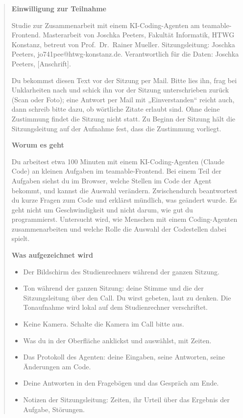 \begin{quote}
\setlength{\emergencystretch}{1em}%
\textbf{Einwilligung zur Teilnahme}

Studie zur Zusammenarbeit mit einem KI-Coding-Agenten am teamable-Frontend. Masterarbeit von Joschka Peeters, Fakultät Informatik, HTWG Konstanz, betreut von Prof.\ Dr.\ Rainer Mueller. Sitzungsleitung: Joschka Peeters, jo741pee@htwg-konstanz.de. Verantwortlich für die Daten: Joschka Peeters, [Anschrift].

Du bekommst diesen Text vor der Sitzung per Mail. Bitte lies ihn, frag bei Unklarheiten nach und schick ihn vor der Sitzung unterschrieben zurück (Scan oder Foto); eine Antwort per Mail mit „Einverstanden“ reicht auch, dann schreib bitte dazu, ob wörtliche Zitate erlaubt sind. Ohne deine Zustimmung findet die Sitzung nicht statt. Zu Beginn der Sitzung hält die Sitzungsleitung auf der Aufnahme fest, dass die Zustimmung vorliegt.

\textbf{Worum es geht}

Du arbeitest etwa 100 Minuten mit einem KI-Coding-Agenten (Claude Code) an kleinen Aufgaben im teamable-Frontend. Bei einem Teil der Aufgaben siehst du im Browser, welche Stellen im Code der Agent bekommt, und kannst die Auswahl verändern. Zwischendurch beantwortest du kurze Fragen zum Code und erklärst mündlich, was geändert wurde. Es geht nicht um Geschwindigkeit und nicht darum, wie gut du programmierst. Untersucht wird, wie Menschen mit einem Coding-Agenten zusammenarbeiten und welche Rolle die Auswahl der Codestellen dabei spielt.

\textbf{Was aufgezeichnet wird}

\begin{itemize}
\item Der Bildschirm des Studienrechners während der ganzen Sitzung.
\item Ton während der ganzen Sitzung: deine Stimme und die der Sitzungsleitung über den Call. Du wirst gebeten, laut zu denken. Die Tonaufnahme wird lokal auf dem Studienrechner verschriftet.
\item Keine Kamera. Schalte die Kamera im Call bitte aus.
\item Was du in der Oberfläche anklickst und auswählst, mit Zeiten.
\item Das Protokoll des Agenten: deine Eingaben, seine Antworten, seine Änderungen am Code.
\item Deine Antworten in den Fragebögen und das Gespräch am Ende.
\item Notizen der Sitzungsleitung: Zeiten, ihr Urteil über das Ergebnis der Aufgabe, Störungen.
\end{itemize}


\end{quote}
